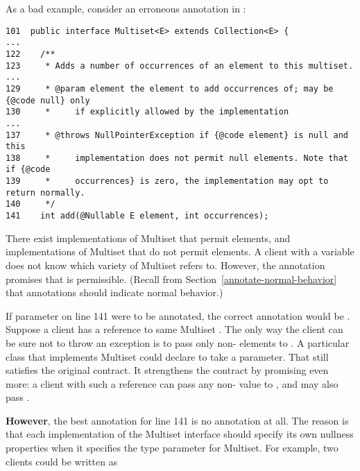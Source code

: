 \begin{sloppypar}
As a bad example, consider an erroneous  annotation in
\href{https://github.com/google/guava/blob/master/guava/src/com/google/common/collect/Multiset.java\#L129}{}:
\end{sloppypar}

\begin{Verbatim}
101  public interface Multiset<E> extends Collection<E> {
...
122    /**
123     * Adds a number of occurrences of an element to this multiset.
...
129     * @param element the element to add occurrences of; may be {@code null} only
130     *     if explicitly allowed by the implementation
...
137     * @throws NullPointerException if {@code element} is null and this
138     *     implementation does not permit null elements. Note that if {@code
139     *     occurrences} is zero, the implementation may opt to return normally.
140     */
141    int add(@Nullable E element, int occurrences);
\end{Verbatim}

There exist implementations of Multiset that permit  elements,
and implementations of Multiset that do not permit  elements.  A
client with a variable  does not know which variety of
Multiset  refers to.  However, the  annotation
promises that  is permissible.  (Recall from
Section~\ref{annotate-normal-behavior} that annotations should indicate
normal behavior.)

If parameter  on line 141 were to be annotated, the correct
annotation would be .  Suppose a client has a reference to
same Multiset .  The only way the client can be sure not to throw an exception is to pass
only non- elements to .  A particular class
that implements Multiset could declare  to take a
 parameter.  That still satisfies the original contract.
It strengthens the contract by promising even more:  a client with such a
reference can pass any non- value to , and may also
pass .

\textbf{However}, the best annotation for line 141 is no annotation at all.
The reason is that each implementation of the Multiset interface should
specify its own nullness properties when it specifies the type parameter
for Multiset.  For example, two clients could be written as

